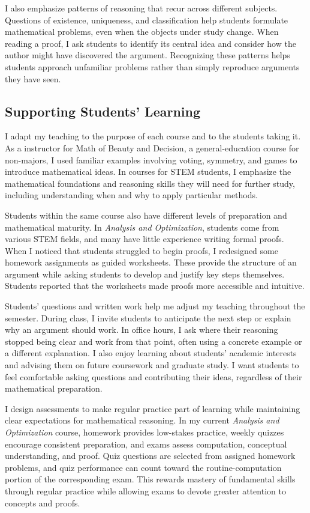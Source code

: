 \documentclass[11pt]{article}
\begin{document}
I also emphasize patterns of reasoning that recur across different subjects. Questions of existence, uniqueness, and classification help students formulate mathematical problems, even when the objects under study change. When reading a proof, I ask students to identify its central idea and consider how the author might have discovered the argument. Recognizing these patterns helps students approach unfamiliar problems rather than simply reproduce arguments they have seen.

\subsection*{Supporting Students’ Learning}
I adapt my teaching to the purpose of each course and to the students taking it. As a instructor for Math of Beauty and Decision, a general-education course for non-majors, I used familiar examples involving voting, symmetry, and games to introduce mathematical ideas. In courses for STEM students, I emphasize the mathematical foundations and reasoning skills they will need for further study, including understanding when and why to apply particular methods.

Students within the same course also have different levels of preparation and mathematical maturity. In \emph{Analysis and Optimization}, students come from various STEM fields, and many have little experience writing formal proofs. When I noticed that students struggled to begin proofs, I redesigned some homework assignments as guided worksheets. These provide the structure of an argument while asking students to develop and justify key steps themselves. Students reported that the worksheets made proofs more accessible and intuitive.

Students' questions and written work help me adjust my teaching throughout the semester. During class, I invite students to anticipate the next step or explain why an argument should work. In office hours, I ask where their reasoning stopped being clear and work from that point, often using a concrete example or a different explanation. I also enjoy learning about students' academic interests and advising them on future coursework and graduate study. I want students to feel comfortable asking questions and contributing their ideas, regardless of their mathematical preparation.

I design assessments to make regular practice part of learning while maintaining clear expectations for mathematical reasoning. In my current \emph{Analysis and Optimization} course, homework provides low-stakes practice, weekly quizzes encourage consistent preparation, and exams assess computation, conceptual understanding, and proof. Quiz questions are selected from assigned homework problems, and quiz performance can count toward the routine-computation portion of the corresponding exam. This rewards mastery of fundamental skills through regular practice while allowing exams to devote greater attention to concepts and proofs.
\end{document}
